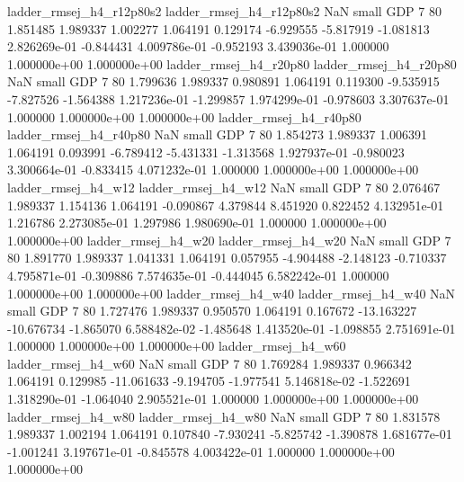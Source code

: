ladder_rmsej_h4_r12p80s2 ladder_rmsej_h4_r12p80s2                   NaN      small      GDP                 7 80 1.851485       1.989337 1.002277       1.064191    0.129174     -6.929555     -5.817919    -1.081813   2.826269e-01 -0.844431 4.009786e-01    -0.952193   3.439036e-01            1.000000    1.000000e+00        1.000000e+00
  ladder_rmsej_h4_r20p80   ladder_rmsej_h4_r20p80                   NaN      small      GDP                 7 80 1.799636       1.989337 0.980891       1.064191    0.119300     -9.535915     -7.827526    -1.564388   1.217236e-01 -1.299857 1.974299e-01    -0.978603   3.307637e-01            1.000000    1.000000e+00        1.000000e+00
  ladder_rmsej_h4_r40p80   ladder_rmsej_h4_r40p80                   NaN      small      GDP                 7 80 1.854273       1.989337 1.006391       1.064191    0.093991     -6.789412     -5.431331    -1.313568   1.927937e-01 -0.980023 3.300664e-01    -0.833415   4.071232e-01            1.000000    1.000000e+00        1.000000e+00
     ladder_rmsej_h4_w12      ladder_rmsej_h4_w12                   NaN      small      GDP                 7 80 2.076467       1.989337 1.154136       1.064191   -0.090867      4.379844      8.451920     0.822452   4.132951e-01  1.216786 2.273085e-01     1.297986   1.980690e-01            1.000000    1.000000e+00        1.000000e+00
     ladder_rmsej_h4_w20      ladder_rmsej_h4_w20                   NaN      small      GDP                 7 80 1.891770       1.989337 1.041331       1.064191    0.057955     -4.904488     -2.148123    -0.710337   4.795871e-01 -0.309886 7.574635e-01    -0.444045   6.582242e-01            1.000000    1.000000e+00        1.000000e+00
     ladder_rmsej_h4_w40      ladder_rmsej_h4_w40                   NaN      small      GDP                 7 80 1.727476       1.989337 0.950570       1.064191    0.167672    -13.163227    -10.676734    -1.865070   6.588482e-02 -1.485648 1.413520e-01    -1.098855   2.751691e-01            1.000000    1.000000e+00        1.000000e+00
     ladder_rmsej_h4_w60      ladder_rmsej_h4_w60                   NaN      small      GDP                 7 80 1.769284       1.989337 0.966342       1.064191    0.129985    -11.061633     -9.194705    -1.977541   5.146818e-02 -1.522691 1.318290e-01    -1.064040   2.905521e-01            1.000000    1.000000e+00        1.000000e+00
     ladder_rmsej_h4_w80      ladder_rmsej_h4_w80                   NaN      small      GDP                 7 80 1.831578       1.989337 1.002194       1.064191    0.107840     -7.930241     -5.825742    -1.390878   1.681677e-01 -1.001241 3.197671e-01    -0.845578   4.003422e-01            1.000000    1.000000e+00        1.000000e+00
